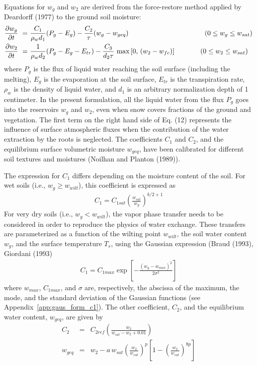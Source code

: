 Equations for $w_g$ and $w_2$ are derived from the force-restore
method applied by Deardorff (1977)\nocite{Deardorff1977} to the ground soil moisture:
%
\begin{align}
%
\frac{\partial w_g }{ \partial t} \,\, =& \,\, \frac{ C_1 }{ \rho_w d_1}
(P_g - E_g) - \frac{C_2 }{ \tau} ( w_g - w_{geq} ) 
\hskip1.52in
\left( 0 \leq w_g \leq w_{sat}\right) \\
%
\frac{\partial w_2 }{ \partial t} \,\, =& \,\, \frac{1 }{ \rho_w d_2}
(P_g - E_g - E_{tr}) - \frac{ C_3 }{ d_2 \tau} \ {\rm max}
\left[ 0,\, ( w_2 - w_{fc} ) \right] 
\hskip.5in
\left(0 \leq w_2 \leq w_{sat}\right)
%
\end{align}
%
where $P_g$ is the flux of liquid water reaching the soil surface
(including the melting),
$E_g$ is the evaporation at the soil surface,
$E_{tr}$ is the transpiration rate,
$\rho_w$ is the density of liquid water,
and $d_1$ is an arbitrary normalization depth of 1 centimeter.
In the present formulation, all the liquid water from
the flux $P_g$ goes into the
reservoirs $w_g$ and $w_2$, even when snow covers fractions of the
ground and vegetation.
The first term on the right hand side of Eq. (12) represents
the influence of surface atmospheric fluxes when the
contribution of the water extraction by the roots is neglected.
The coefficients $C_1$ and $C_2$, and the equilibrium surface volumetric
moisture $w_{geq}$,
have been calibrated for different soil textures and
moistures (Noilhan and Planton (1989)\nocite{Noilhan1989}).

The expression for $C_1$ differs depending on the moisture content
of the soil.  For wet soils
(i.e., $w_g \geq w_{wilt}$), this coefficient is expressed as
\begin{eqnarray}
C_1 = C_{1sat} \left( \frac{w_{sat} }{ w_g} \right)^{b/2+1}
\end{eqnarray}
For very dry soils (i.e., $w_g < w_{wilt}$),
the vapor phase transfer needs to be considered in order to reproduce the
physics of water exchange.  These transfers are parameterized
as a function of the wilting point $w_{wilt}$, the soil water
content $w_g$,
and the surface temperature $T_s$, using the Gaussian expression
(Braud \etal (1993)\nocite{Braud1993-10-01}, Giordani (1993)\nocite{Giordani1993}
\begin{eqnarray}
C_1 = C_{1max} \exp \left[ - \frac{ (w_g-w_{max})^2 }{ 2 \sigma^2 } \right]
\end{eqnarray}
where $w_{max}$, $C_{1max}$, and $\sigma$ are, respectively, the abscissa
of the maximum, the mode, and the standard deviation of the
Gaussian functions (see Appendix~\ref{app:gaus_form_c1}).
The other coefficient, $C_2$, and the equilibrium water
content, $w_{geq}$, are given by
\begin{eqnarray}
C_2&=&C_{2ref} \left( \frac{w_2 }{ w_{sat}-w_2+0.01} \right) \\
w_{geq}&=&w_2 - a \, w_{sat} \left( \frac{ w_2 }{ w_{sat}} \right)^p
\left[ 1 - \left(\frac{ w_2 }{ w_{sat}} \right)^{8p} \right]
\end{eqnarray}

